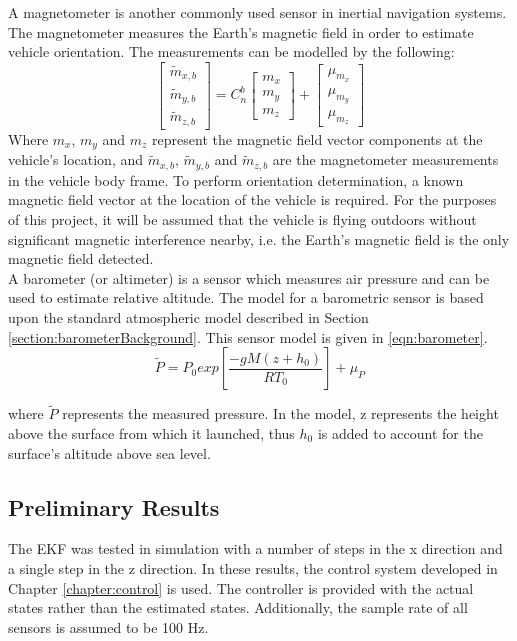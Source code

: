 A magnetometer is another commonly used sensor in inertial navigation systems. The magnetometer measures the Earth's magnetic field in order to estimate vehicle orientation. The measurements can be modelled by the following:
\begin{equation}\label{eqn:mag}
\begin{bmatrix}
\tilde{m}_{x,b}\\
\tilde{m}_{y,b}\\
\tilde{m}_{z,b}
\end{bmatrix}
=
C^{b}_{n}
\begin{bmatrix}
m_{x}\\
m_{y}\\
m_{z}
\end{bmatrix}
+
\begin{bmatrix}
\mu_{m_{x}}\\
\mu_{m_{y}}\\
\mu_{m_{z}}
\end{bmatrix}
\end{equation}
Where $m_{x}$, $m_{y}$ and $m_{z}$ represent the magnetic field vector components at the vehicle's location, and $\tilde{m}_{x,b}$, $\tilde{m}_{y,b}$ and $\tilde{m}_{z,b}$ are the magnetometer measurements in the vehicle body frame. To perform orientation determination, a known magnetic field vector at the location of the vehicle is required. For the purposes of this project, it will be assumed that the vehicle is flying outdoors without significant magnetic interference nearby, i.e. the Earth's magnetic field is the only magnetic field detected.\\

A barometer (or altimeter) is a sensor which measures air pressure and can be used to estimate relative altitude. The model for a barometric sensor is based upon the standard atmospheric model described in Section \ref{section:barometerBackground}. This sensor model is given in \eqref{eqn:barometer}.
\begin{equation}\label{eqn:barometer}
\tilde{P}=P_{0}exp\left[\frac{-g M (z+h_{0})}{R T_{0}}\right]+\mu_{P}
\end{equation}

where $\tilde{P}$ represents the measured pressure. In the model, z represents the height above the surface from which it launched, thus $h_{0}$ is added to account for the surface's altitude above sea level.


\subsection{Preliminary Results}
The EKF was tested in simulation with a number of steps in the x direction and a single step in the z direction. In these results, the control system developed in Chapter \ref{chapter:control} is used. The controller is provided with the actual states rather than the estimated states. Additionally, the sample rate of all sensors is assumed to be 100 Hz.\\

